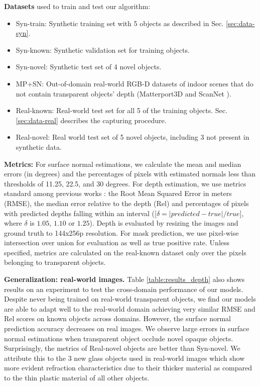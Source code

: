 \documentclass[letterpaper, 10 pt, conference]{ieeeconf}
\newcommand{\myparagraph}[1]{\vspace{0.03in}\noindent\textbf{#1}}
\begin{document}
\textbf{Datasets} used to train and test our algorithm: 
\begin{itemize}
    \item Syn-train: Synthetic training set with 5 objects as described in Sec. \ref{sec:data-syn}.
    \item Syn-known: Synthetic validation set for training objects.
    \item Syn-novel: Synthetic test set of 4 novel objects.
    
    \item MP+SN: Out-of-domain real-world RGB-D datasets of indoor scenes that do not contain transparent objects' depth (Matterport3D \cite{Matterport3D} and ScanNet \cite{dai2017scannet}).
    \item Real-known: Real-world test set for all 5 of the training objects. Sec. \ref{sec:data-real} describes the capturing procedure.
    \item Real-novel: Real world test set of 5 novel objects, including 3 not present in synthetic data.
\end{itemize}

\myparagraph{Metrics:}
For surface normal estimations, we calculate the mean and median errors (in degrees) and the percentages of pixels with estimated normals less than thresholds of 11.25, 22.5, and 30 degrees.
For depth estimation, we use metrics standard among previous works \cite{corr2014EigenPF}: the Root Mean Squared Error in meters (RMSE), the median error relative to the depth (Rel) and percentages of pixels with predicted depths falling within an interval ([$ \delta = |predicted - true| / true$], where $\delta$ is $1.05$, $1.10$ or $1.25$). Depth is evaluated by resizing the images and ground truth to 144x256p resolution.
For mask prediction, we use pixel-wise intersection over union for evaluation as well as true positive rate. 
Unless specified, metrics are calculated on the real-known dataset only over the pixels belonging to transparent objects.


\myparagraph{Generalization: real-world images.}
Table \ref{table:results_depth} also shows results on an experiment to test the cross-domain performance of our models. Despite never being trained on real-world transparent objects, we find our models are able to adapt well to the real-world domain achieving very similar RMSE and Rel scores on known objects across domains. However, the surface normal prediction accuracy decreases on real images. We observe large errors in surface normal estimations when transparent object occlude novel opaque objects. 
Surprisingly, the metrics of Real-novel objects are better than Syn-novel. We attribute this to the 3 new glass objects used in real-world images which show more evident refraction characteristics due to their thicker material as compared to the thin plastic material of all other objects.
\end{document}

